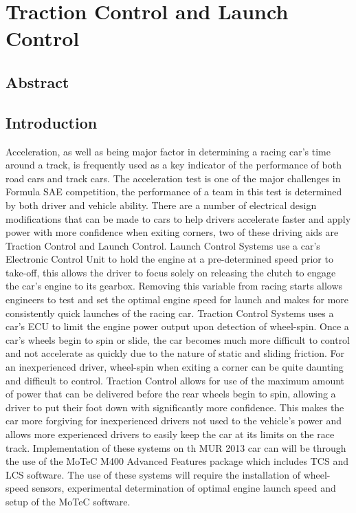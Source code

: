 \chapter{Traction Control and Launch Control}

\section{Abstract}

\section{Introduction}
Acceleration, as well as being major factor in determining a racing car’s time around a track, is frequently used as a key indicator of the performance of both road cars and track cars. The acceleration test is one of the major challenges in Formula SAE competition, the performance of a team in this test is determined by both driver and vehicle ability. 
There are a number of electrical design modifications that can be made to cars to help drivers accelerate faster and apply power with more confidence when exiting corners, two of these driving aids are Traction Control and Launch Control. 
Launch Control Systems use a car’s Electronic Control Unit to hold the engine at a pre-determined speed prior to take-off, this allows the driver to focus solely on releasing the clutch to engage the car's engine to its gearbox. Removing this variable from racing starts allows engineers to test and set the optimal engine speed for launch and makes for more consistently quick launches of the racing car. 
Traction Control Systems uses a car’s ECU to limit the engine power output upon detection of wheel-spin. Once a car’s wheels begin to spin or slide, the car becomes much more difficult to control and not accelerate as quickly due to the nature of static and sliding friction. For an inexperienced driver, wheel-spin when exiting a corner can be quite daunting and difficult to control. Traction Control allows for use of the maximum amount of power that can be delivered before the rear wheels begin to spin, allowing a driver to put their foot down with significantly more confidence. This makes the car more forgiving for inexperienced drivers not used to the vehicle's power and allows more experienced drivers to easily keep the car at its limits on the race track.
Implementation of these systems on th MUR 2013 car can will be through the use of the MoTeC M400 Advanced Features package which includes TCS and LCS software. The use of these systems will require the installation of wheel-speed sensors, experimental determination of optimal engine launch speed and setup of the MoTeC software.

